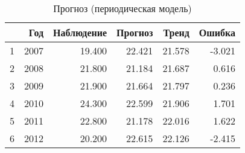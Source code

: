 \begin{table}[ht]
\centering
\begin{tabular}{rrrrrr}
  \hline
 & Год & Наблюдение & Прогноз & Тренд & Ошибка \\ 
  \hline
1 & 2007 & 19.400 & 22.421 & 21.578 & -3.021 \\ 
  2 & 2008 & 21.800 & 21.184 & 21.687 & 0.616 \\ 
  3 & 2009 & 21.900 & 21.664 & 21.797 & 0.236 \\ 
  4 & 2010 & 24.300 & 22.599 & 21.906 & 1.701 \\ 
  5 & 2011 & 22.800 & 21.178 & 22.016 & 1.622 \\ 
  6 & 2012 & 20.200 & 22.615 & 22.126 & -2.415 \\ 
   \hline
\end{tabular}
\caption{Прогноз (периодическая модель)} 
\label{table:auto-class-26-prediction}
\end{table}
